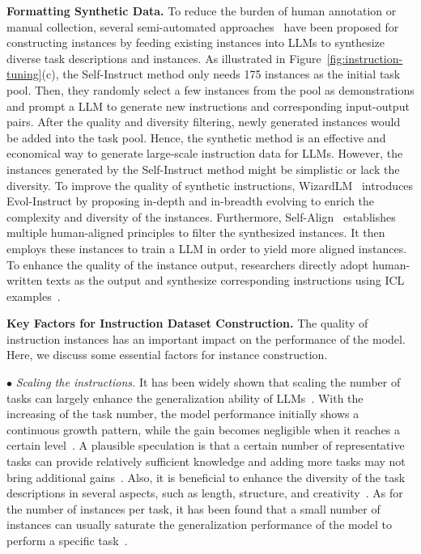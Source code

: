 \textbf{Formatting Synthetic Data.} To reduce the burden of human annotation or manual collection, several semi-automated approaches~\cite{Wang-arXiv-2022-Self} have been proposed for constructing instances by feeding existing instances into LLMs to synthesize diverse task descriptions and {instances}. As illustrated in Figure~\ref{fig:instruction-tuning}(c), the Self-Instruct method only needs 175 instances as the initial task pool. Then, they randomly select a few instances from the pool as demonstrations and prompt a LLM to generate new instructions and corresponding input-output pairs. After the quality and diversity filtering, newly generated instances would  be added into the task pool. Hence, the synthetic method is an effective and economical way to generate large-scale instruction data for LLMs. However, the instances generated by the Self-Instruct method might be  simplistic or lack the diversity. To improve the quality of  synthetic instructions,  WizardLM~\cite{Xu-arxiv-2023-WizardLM} introduces Evol-Instruct by proposing in-depth and in-breadth evolving to enrich the complexity and diversity of the instances. Furthermore, Self-Align~\cite{Sun-arxiv-2023-Principle} establishes multiple human-aligned principles to filter the synthesized instances. It then employs these instances to train a LLM in order to yield more aligned instances. To enhance the quality of the instance output, researchers directly adopt human-written texts as the output and synthesize corresponding instructions using ICL examples~\cite{Li-arxiv-2023-Self}.

\textbf{Key Factors for Instruction Dataset Construction.} The quality of instruction instances has an important impact on the performance of the model. Here, we discuss some essential factors for instance construction. 

$\bullet$ \emph{Scaling the instructions.} It has been widely shown that scaling the number of tasks can largely enhance the generalization ability of LLMs~\cite{Wei-ICLR-2022-Finetuned,Sanh-ICLR-2022-Multitask,Wang-EMNLP-2022-Super}. With the increasing of the task number, the model performance initially shows a continuous growth pattern, while the gain becomes negligible when it reaches a certain level~\cite{Wang-EMNLP-2022-Super,Chung-arxiv-2022-Scaling}. A plausible speculation is that a certain number of representative  tasks can provide relatively sufficient  knowledge and adding more tasks  may not bring additional gains~\cite{Chung-arxiv-2022-Scaling}. Also,  it is  beneficial to enhance the diversity of the task descriptions in several aspects, such as length, structure, and creativity~\cite{Sanh-ICLR-2022-Multitask}. As for the number of instances per task, it has been found that a small number of instances can usually saturate the generalization performance of the model to perform a specific task~\cite{Wei-ICLR-2022-Finetuned,Chung-arxiv-2022-Scaling}.


